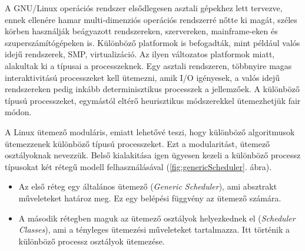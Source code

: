 

A GNU/Linux operációs rendszer elsődlegesen asztali gépekhez lett tervezve, ennek ellenére hamar multi-dimenziós operációs rendszerré nőtte ki magát, széles körben használják beágyazott rendszereken, szervereken, mainframe-eken és szuperszámítógépeken is. Különböző platformok is befogadták, mint például valós idejű rendszerek, SMP, virtualizáció. Az ilyen változatos platformok miatt, alakultak ki a típusai a processzeknek. Egy asztali rendszeren, többnyire magas interaktivitású processzeket kell ütemezni, amik I/O igényesek, a valós idejű rendszereken pedig inkább  determinisztikus processzek a jellemzőek. A különböző típusú processzeket, egymástól eltérő heurisztikus módszerekkel ütemezhetjük fair módon.


A Linux ütemező moduláris, emiatt lehetővé teszi, hogy különböző algoritmusok ütemezzenek különböző típusú processzeket. Ezt a modularitást, ütemező osztályoknak nevezzük. Belső kialakitása igen ügyesen kezeli a különböző processz típusokat két rétegű modell felhasználásával (\ref{fig:genericScheduler}. ábra).
\begin{itemize}
\item Az első réteg egy általános ütemező (\textit{Generic Scheduler}), ami absztrakt műveleteket határoz meg. Ez egy belépési függvény az ütemező számára.
\item A második rétegben maguk az ütemező osztályok helyezkednek el (\textit{Scheduler Classes}), ami a tényleges ütemezési műveleteket tartalmazza. Itt történik a különböző  processz osztályok ütemezése.
\end{itemize} 

